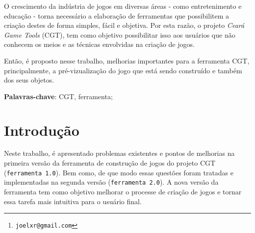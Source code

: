 \documentclass[12pt,twoside,openright,a4paper,english,brazil,sumario=tradicional]{abntex2}
\author{Joel Xavier Rocha\thanks{\texttt{joelxr@gmail.com}}}
\begin{document}
\frenchspacing
\imprimircapa
\imprimirfolhaderosto*

%     

% 

\begin{agradecimentos}

\end{agradecimentos}

\setlength{\absparsep}{18pt}
\begin{resumo}
O crescimento da indústria de jogos em diversas áreas - como entretenimento e educação - torna necessário a elaboração de ferramentas que possibilitem a criação destes de forma simples, fácil e objetiva. Por esta razão, o projeto \emph{Ceará Game Tools} (CGT), tem como objetivo possibilitar isso aos usuários que não conhecem os meios e as técnicas envolvidas na criação de jogos.

Então, é proposto nesse trabalho, melhorias importantes para a ferramenta CGT, principalmente, a pré-vizualização do jogo que está sendo construído e também dos seus objetos.

\vspace{\onelineskip}
\noindent
\textbf{Palavras-chave}: CGT, ferramenta;
\end{resumo}

\listoffigures*
\cleardoublepage

\listoftables*
\cleardoublepage

\tableofcontents*
\cleardoublepage

\textual

\chapter{Introdução} %
\label{chap:introducao}

Neste trabalho, é apresentado problemas existentes e pontos de melhorias na primeira versão da ferramenta de construção de jogos do projeto CGT (\texttt{ferramenta 1.0}). Bem como, de que modo essas questões foram tratadas e implementadas na segunda versão (\texttt{ferramenta 2.0}). A nova versão da ferramenta tem como objetivo melhorar o processe de criação de jogos e tornar essa tarefa mais intuitiva para o usuário final.
\end{document}
